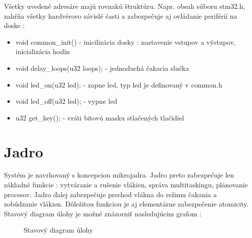Všetky uvedené adresáre majú rovnakú štruktúru. Napr. obsah súboru stm32.h, zahŕňa všetky hardvérovo závislé časti a zabezpečuje aj ovládanie periférií na doske :
\begin{itemize} 
 \item void common\_init() - inicilizácia dosky : nastavenie vstupov a výstupov, inicializácia hodín
 \item void delay\_loops(u32 loops); - jednoduchá čakacia slučka
 \item void led\_on(u32 led); - zapne led, typ led je definovaný v common.h
 \item void led\_off(u32 led); - vypne led
 \item u32 get\_key(); - vráti bitovú masku stlačených tlačidiel
\end{itemize}

\section{Jadro}

Systém je navrhovaný s koncepciou mikrojadra. Jadro preto zabezpečuje len základné funkcie : vytváranie a rušenie vlákien, správa multitaskingu, plánovanie procesov. Jadro ďalej zabezpečuje prechod vlákna do režimu čakania a zobúdzanie vlákien. Dôležitou funkciou je aj elementárne zabezpečenie atomicity. Stavový diagram úlohy je možné znázorniť nasledujúcim grafom :



\begin{figure}[ht]
\begin{center}
\begin{minipage}{1.1\linewidth}
\begin{center}




\caption {Stavový diagram úlohy}
\label{obr1}
\end{center}
\end{minipage}
\end{center}
\end{figure}

